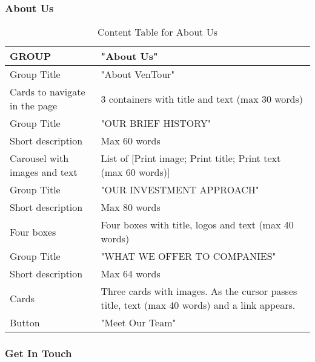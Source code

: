 \documentclass[../../DD.tex]{subfiles}
\begin{document}
    \subsubsection{About Us}
         \begin{table}[h]
            \begin{tabular}{ |l|p{}| }
            \hline
            GROUP & "About Us"\\
            \hline
            Group Title & "About VenTour" \\
            \hline
            Cards to navigate in the page & 3 containers with title and text (max 30 words)\\
            \hline
            Group Title & "OUR BRIEF HISTORY" \\
            \hline
            Short description & Max 60 words \\
            \hline
            Carousel with images and text & List of [Print image; Print title; Print text (max 60 words)] \\
            \hline
            Group Title & "OUR INVESTMENT APPROACH" \\
            \hline
            Short description & Max 80 words \\
            \hline
            Four boxes & Four boxes with title, logos and text (max 40 words) \\
            \hline
            Group Title & "WHAT WE OFFER TO COMPANIES" \\
            \hline
            Short description & Max 64 words \\
            \hline
            Cards & Three cards with images. As the cursor passes title, text (max 40 words) and a link appears.\\
            \hline
            Button & "Meet Our Team" \\
            \hline
        \end{tabular}
        \caption{Content Table for About Us}
        \end{table}  
    
    \subsubsection{Get In Touch}
\end{document}
